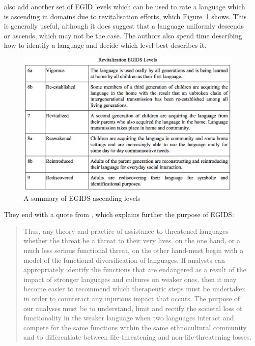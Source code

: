 \citet{lewis2010assessing} also add another set of EGID levels which can be used to rate a language which is ascending in domains due to revitalisation efforts, which Figure~\ref{fig:egids-up} shows. This is generally useful, although it does suggest that a language uniformly descends or ascends, which may not be the case. The authors also spend time describing how to identify a language and decide which level best describes it.

\begin{figure}
 \centering
 \includegraphics[width=.8\textwidth]{img/egids-up.png}
 \caption{A summary of EGIDS ascending levels \citep[117]{lewis2010assessing}}
 \label{fig:egids-up}
\end{figure}

They end with a quote from \citet{fishman2001can}, which explains further the purpose of EGIDS:

\begin{quote}
Thus, any theory and practice of assistance to threatened languages-whether the threat be a threat to their very lives, on the one hand, or a much less serious functional threat, on  the  other  hand-must  begin  with  a  model  of  the  functional  diversification  of languages. If analysts can appropriately identify the functions that are endangered as a result of the impact of stronger languages and cultures on weaker ones, then it may become easier to recommend which therapeutic steps must be undertaken in order to counteract any injurious impact that occurs. The purpose of our analyses must be to understand, limit and rectify the societal loss of functionality in the weaker language when  two  languages  interact  and  compete  for  the  same  functions within  the  same
ethnocultural  community  and  to  differentiate  between  life-threatening  and  non-life-threatening losses.
\end{quote}


